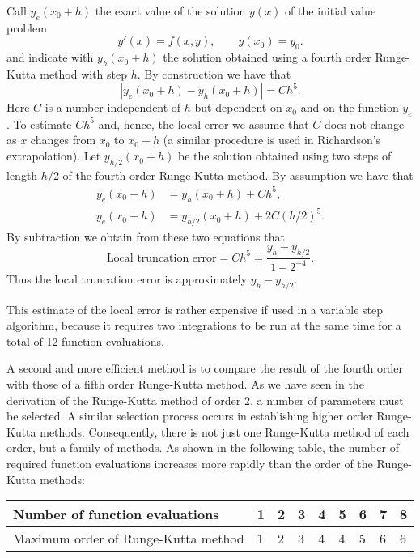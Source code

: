 Call $y_e(x_0+h)$ the exact value of the solution $y(x)$ of the
initial value problem
%
\begin{equation}
  y'(x) = f(x,y) , \qquad y(x_0) = y_0 .
\end{equation}
%
and indicate with $y_h(x_0+h)$ the solution obtained using a fourth
order Runge-Kutta method with step $h$.  By construction we have that
%
\begin{equation}
  |y_e(x_0+h) - y_h(x_0+h)| = C h^5.
  \label{IVP.eq:41}
\end{equation}
%
Here $C$ is a number independent of $h$ but dependent on $x_0$ and on
the function $y_e$.  To estimate $C h^5$ and, hence, the local error
we assume that $C$ does not change as $x$ changes from $x_0$ to $x_0 +
h$ (a similar procedure is used in Richardson's extrapolation).  Let
$y_{h/2}(x_0+h)$ be the solution obtained using two steps of length
$h/2$ of the fourth order Runge-Kutta method.  By assumption we have
that
%
\begin{subequations}
\label{IVP.eq:42}
  \begin{align}
    y_e(x_0+h) &= y_{h}(x_0+h) + C h^5 , \\
    y_e(x_0+h) &= y_{h/2}(x_0+h) + 2 C (h/2)^5 .
  \end{align}
\end{subequations}
%
By subtraction we obtain from these two equations that
%
\begin{equation}
  \text{Local truncation error} = C h^5 =
  \frac{y_h - y_{h/2}}{1-2^{-4}} .
  \label{IVP.eq:43}
\end{equation}
%
Thus the local truncation error is approximately $y_h - y_{h/2}$.

This estimate of the local error is rather expensive if used in a
variable step algorithm, because it requires two integrations to be
run at the same time for a total of 12 function evaluations.

A second and more efficient method is to compare the result of the
fourth order with those of a fifth order Runge-Kutta method.  As we
have seen in the derivation of the Runge-Kutta method of order 2, a
number of parameters must be selected.  A similar selection process
occurs in establishing higher order Runge-Kutta methods.
Consequently, there is not just one Runge-Kutta method of each order,
but a family of methods.  As shown in the following table, the number
of required function evaluations increases more rapidly than the order
of the Runge-Kutta methods:

\begin{center}
  \begin{tabular}{l|llllllll}
    Number of function evaluations & 1 & 2 & 3 & 4 & 5 & 6 & 7 & 8 \\ \hline
    Maximum order of Runge-Kutta method & 1 & 2 & 3 & 4 & 4 & 5 & 6 & 6
  \end{tabular}
\end{center}

